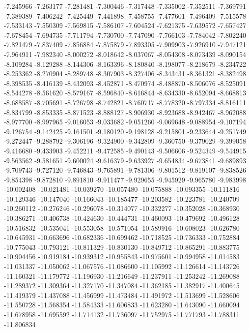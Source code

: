-7.245966
-7.263177
-7.281481
-7.300446
-7.317448
-7.335002
-7.352511
-7.369791
-7.389389
-7.406242
-7.425449
-7.441898
-7.458755
-7.477601
-7.496409
-7.515578
-7.533143
-7.550309
-7.569815
-7.586107
-7.604524
-7.621375
-7.639572
-7.657427
-7.678454
-7.694735
-7.711794
-7.730700
-7.747090
-7.766103
-7.784042
-7.802240
-7.821479
-7.837409
-7.856884
-7.875879
-7.893305
-7.909903
-7.926910
-7.947121
-7.964911
-7.982340
-8.000272
-8.018642
-8.037067
-8.054308
-8.073439
-8.090154
-8.109284
-8.129288
-8.144306
-8.163396
-8.180840
-8.198077
-8.218679
-8.234722
-8.253362
-8.270904
-8.289748
-8.307903
-8.327406
-8.343431
-8.361321
-8.382498
-8.398535
-8.416139
-8.432093
-8.452871
-8.470974
-8.488870
-8.506076
-8.525091
-8.544278
-8.561620
-8.579167
-8.596840
-8.616844
-8.634330
-8.652094
-8.668813
-8.688587
-8.705691
-8.726798
-8.742821
-8.760717
-8.778320
-8.797334
-8.816111
-8.834799
-8.853335
-8.871523
-8.888127
-8.906930
-8.923688
-8.942467
-8.962088
-8.977700
-8.997965
-9.016053
-9.033682
-9.051260
-9.069648
-9.088954
-9.107194
-9.126754
-9.142425
-9.161501
-9.180120
-9.198128
-9.215801
-9.233644
-9.251749
-9.272447
-9.288792
-9.306196
-9.324900
-9.342809
-9.360750
-9.379029
-9.399058
-9.416680
-9.433903
-9.452211
-9.472585
-9.490143
-9.506606
-9.524349
-9.544915
-9.563562
-9.581651
-9.600024
-9.616379
-9.633927
-9.654834
-9.673841
-9.689893
-9.709743
-9.727120
-9.746843
-9.765891
-9.781306
-9.801512
-9.819107
-9.838526
-9.854398
-9.872810
-9.891810
-9.911477
-9.929655
-9.945929
-9.965780
-9.983998
-10.002408
-10.021481
-10.039270
-10.057480
-10.075888
-10.093355
-10.111816
-10.129346
-10.147040
-10.166043
-10.185477
-10.203582
-10.223781
-10.240709
-10.260112
-10.276246
-10.296078
-10.314077
-10.332277
-10.352028
-10.368930
-10.386271
-10.406738
-10.424630
-10.444731
-10.460093
-10.479692
-10.496128
-10.516832
-10.535041
-10.553058
-10.571054
-10.589916
-10.608023
-10.626780
-10.645931
-10.663696
-10.682336
-10.699462
-10.718525
-10.736333
-10.752884
-10.775043
-10.793121
-10.811329
-10.830130
-10.849712
-10.865291
-10.883775
-10.904456
-10.919184
-10.939312
-10.955843
-10.975601
-10.994958
-11.014583
-11.031337
-11.050062
-11.067576
-11.086600
-11.105992
-11.126614
-11.143726
-11.160321
-11.179772
-11.196930
-11.216649
-11.237911
-11.253242
-11.269088
-11.289372
-11.309364
-11.327170
-11.347084
-11.362185
-11.382917
-11.400645
-11.419379
-11.437088
-11.456999
-11.473484
-11.491972
-11.513699
-11.528606
-11.550728
-11.568354
-11.584333
-11.606833
-11.623280
-11.643090
-11.660094
-11.678958
-11.695592
-11.714132
-11.736097
-11.752975
-11.771793
-11.788311
-11.806834

